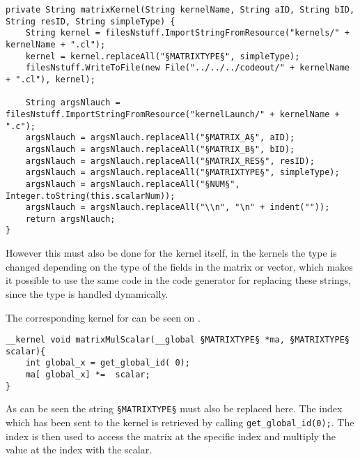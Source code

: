 \begin{lstlisting}[caption=Code for replacing strings with the corresponding information to be appended to the outputCode.,numbers=none,frame=tlrb,label={lst:replaceString}]
private String matrixKernel(String kernelName, String aID, String bID, String resID, String simpleType) {
    String kernel = filesNstuff.ImportStringFromResource("kernels/" + kernelName + ".cl");
    kernel = kernel.replaceAll("§MATRIXTYPE§", simpleType);
    filesNstuff.WriteToFile(new File("../../../codeout/" + kernelName + ".cl"), kernel);

    String argsNlauch = filesNstuff.ImportStringFromResource("kernelLaunch/" + kernelName + ".c");
    argsNlauch = argsNlauch.replaceAll("§MATRIX_A§", aID);
    argsNlauch = argsNlauch.replaceAll("§MATRIX_B§", bID);
    argsNlauch = argsNlauch.replaceAll("§MATRIX_RES§", resID);
    argsNlauch = argsNlauch.replaceAll("§MATRIXTYPE§", simpleType);
    argsNlauch = argsNlauch.replaceAll("§NUM§", Integer.toString(this.scalarNum));
    argsNlauch = argsNlauch.replaceAll("\\n", "\n" + indent(""));
    return argsNlauch;
}
\end{lstlisting}

However this must also be done for the kernel itself, in the kernels the type is changed depending on the type of the fields in the matrix or vector, which makes it possible to use the same code in the code generator for replacing these strings, since the type is handled dynamically.

The corresponding kernel for  can be seen on .
\begin{lstlisting}[caption=Kernel code for multiplying a matrix or vector with a scalar.,numbers=none,frame=tlrb,label={lst:kernel}]
__kernel void matrixMulScalar(__global §MATRIXTYPE§ *ma, §MATRIXTYPE§ scalar){
	int global_x = get_global_id( 0);
	ma[ global_x] *=  scalar;
}
\end{lstlisting}

As can be seen the string \texttt{§MATRIXTYPE§} must also be replaced here.
The index which has been sent to the kernel is retrieved by calling \texttt{get\_global\_id(0);}.
The index is then used to access the matrix at the specific index and multiply the value at the index with the scalar.

